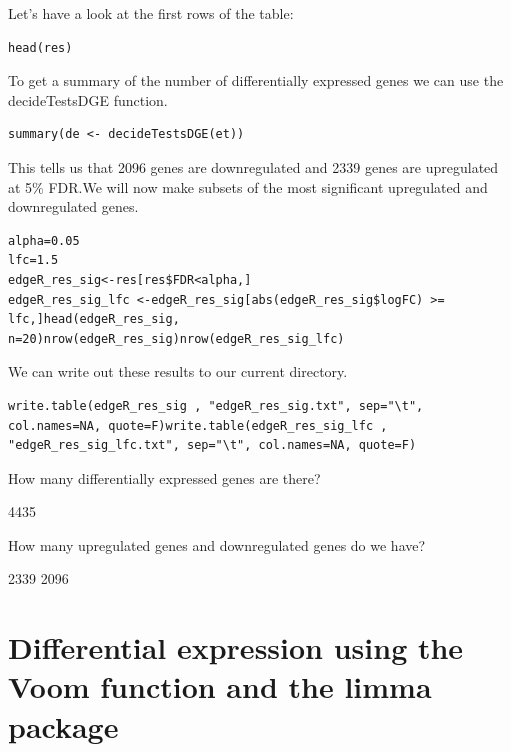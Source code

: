 \begin{steps}
\begin{steps}
Let's have a look at the first rows of the table:
\begin{lstlisting}
head(res)
\end{lstlisting}
\end{steps}


To get a summary of the number of differentially expressed genes we can use the decideTestsDGE function.
\begin{steps}
\begin{lstlisting}summary(de <- decideTestsDGE(et))
\end{lstlisting}
\end{steps}
This tells us that 2096 genes are downregulated and 2339 genes are upregulated at 5\% FDR.We will now make subsets of the most significant upregulated and downregulated genes.

\begin{steps}
\begin{lstlisting}
alpha=0.05
lfc=1.5
edgeR_res_sig<-res[res$FDR<alpha,]
edgeR_res_sig_lfc <-edgeR_res_sig[abs(edgeR_res_sig$logFC) >= lfc,]head(edgeR_res_sig, n=20)nrow(edgeR_res_sig)nrow(edgeR_res_sig_lfc)

\end{lstlisting}
\end{steps}
We can write out these results to our current directory.
\begin{steps}
\begin{lstlisting}
write.table(edgeR_res_sig , "edgeR_res_sig.txt", sep="\t", col.names=NA, quote=F)write.table(edgeR_res_sig_lfc , "edgeR_res_sig_lfc.txt", sep="\t", col.names=NA, quote=F)
\end{lstlisting}

\end{steps}

\begin{questions}
How many differentially expressed genes are there? 
\begin{answer}
4435
\end{answer}

How many upregulated genes and downregulated genes do we have?
\begin{answer}
2339
2096
\end{answer}
\end{questions}

\newpage

\section{Differential expression using the Voom function and the limma package}


\end{steps}
